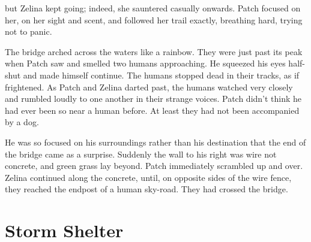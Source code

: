 \documentclass[12pt]{book}
\begin{document}
 but Zelina kept going; indeed, she sauntered casually onwards. Patch focused on her, on her sight and scent, and followed her trail exactly, breathing hard, trying not to panic.\par
 The bridge arched across the waters like a rainbow. They were just past its peak when Patch saw and smelled two humans approaching. He squeezed his eyes half-shut and made himself continue. The humans stopped dead in their tracks, as if frightened. As Patch and Zelina darted past, the humans watched very closely and rumbled loudly to one another in their strange voices. Patch didn't think he had ever been so near a human before. At least they had not been accompanied by a dog.\par
 He was so focused on his surroundings rather than his destination that the end of the bridge came as a surprise. Suddenly the wall to his right was wire not concrete, and green grass lay beyond. Patch immediately scrambled up and over. Zelina continued along the concrete, until, on opposite sides of the wire fence, they reached the endpost of a human sky-road. They had crossed the bridge.\par

\section{Storm Shelter}
\end{document}

